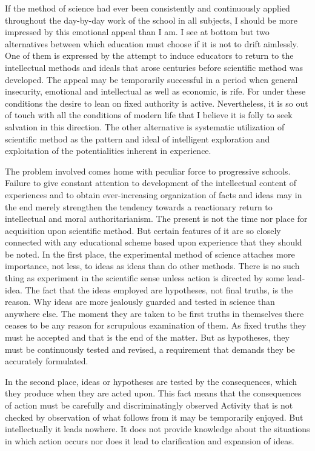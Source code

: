If the method of science had ever been consistently and continuously applied 
throughout the day-by-day work of the school in all subjects, I should be more impressed 
by this emotional appeal than I am. I see at bottom but two alternatives between which 
education must choose if it is not to drift aimlessly. One of them is expressed by the 
attempt to induce educators to return to the intellectual methods and ideals that arose 
centuries before scientific method was developed. The appeal may be temporarily 
successful in a period when general insecurity, emotional and intellectual as well as 
economic, is rife. For under these conditions the desire to lean on fixed authority is 
active. Nevertheless, it is so out of touch with all the conditions of modern life that I 
believe it is folly to seek salvation in this direction. The other alternative is systematic 
utilization of scientific method as the pattern and ideal of intelligent exploration and 
exploitation of the potentialities inherent in experience. 

The problem involved comes home with peculiar force to progressive schools. Failure 
to give constant attention to development of the intellectual content of experiences and to 
obtain ever-increasing organization of facts and ideas may in the end merely strengthen 
the tendency towards a reactionary return to intellectual and moral authoritarianism. The 
present is not the time nor place for acquisition upon scientific method. But certain 
features of it are so closely connected with any educational scheme based upon 
experience that they should be noted. In the first place, the experimental method of 
science attaches more importance, not less, to ideas as ideas than do other methods. There 
is no such thing as experiment in the scientific sense unless action is directed by some 
lead- idea. The fact that the ideas employed are hypotheses, not final truths, is the reason. 
Why ideas are more jealously guarded and tested in science than anywhere else. The 
moment they are taken to be first truths in themselves there ceases to be any reason for 
scrupulous examination of them. As fixed truths they must he accepted and that is the end 
of the matter. But as hypotheses, they must be continuously tested and revised, a 
requirement that demands they be accurately formulated. 

In the second place, ideas or hypotheses are tested by the consequences, which they 
produce when they are acted upon. This fact means that the consequences of action must 
be carefully and discriminatingly observed Activity that is not checked by observation of 
what follows from it may be temporarily enjoyed. But intellectually it leads nowhere. It 
does not provide knowledge about the situations in which action occurs nor does it lead 
to clarification and expansion of ideas. 


